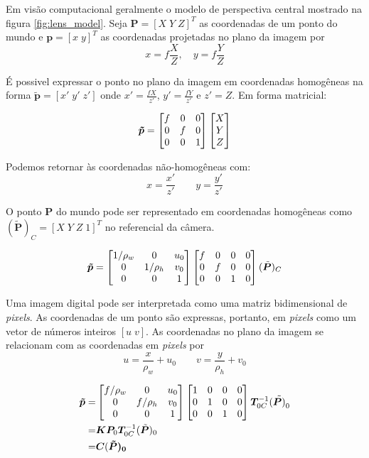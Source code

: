 Em visão computacional geralmente o modelo de perspectiva central mostrado na figura \ref{fig:lens_model}.
Seja $\bm{P} = [X\; Y\; Z]^T$ as coordenadas de um ponto do mundo e $\bm{p} = [x\;y]^T$ as coordenadas projetadas no plano da imagem por
\begin{equation}
x = f \frac{X}{Z}, \quad y = f \frac{Y}{Z}
\end{equation}

É possivel expressar o ponto no plano da imagem em coordenadas homogêneas na forma $\tilde{\bm{p}} = [x'\; y' \; z']$ onde $x' = \frac{fX}{z'}$, $y' = \frac{fY}{z'}$ e $z' = Z$. Em forma matricial:

\begin{equation}
\bm{\tilde{p}} = 
\begin{bmatrix} f & 0 & 0 \\
	 0 & f & 0 \\
	 0 & 0 & 1	
\end{bmatrix}
\begin{bmatrix}X\\Y\\Z\end{bmatrix}
\end{equation}

Podemos retornar às coordenadas não-homogêneas com:
\[ x = \frac{x'}{z'} \qquad y = \frac{y'}{z'}\]

O ponto $\bm{P}$ do mundo pode ser representado em coordenadas homogêneas como $(\bm{\tilde{P}})_C = [X \; Y \; Z \; 1]^T$ no referencial da câmera.

\begin{equation}
\bm{\tilde{p}} = 
\begin{bmatrix}
	1/\rho_w & 0 & u_0 \\
	0        & 1/\rho_h &v_0 \\
	0 & 0 & 1 \\
\end{bmatrix}
\begin{bmatrix} f & 0 & 0 & 0\\
	 0 & f & 0 & 0\\
	 0 & 0 & 1 & 0	
\end{bmatrix}
(\tilde{\bm{P}})_C
\end{equation}

Uma imagem digital pode ser interpretada como uma matriz bidimensional de \textit{pixels}. As coordenadas de um ponto são expressas, portanto, em \textit{pixels} como um vetor de números inteiros $[u\; v]$. As coordenadas no plano da imagem se relacionam com as coordenadas em \textit{pixels} por
\begin{equation}
u =  \frac{x}{\rho_w} + u_0 \qquad v = \frac{y}{\rho_h} + v_0
\end{equation}


\begin{align}\label{eq:camera_projection}
\bm{\tilde{p}} =& 
\begin{bmatrix}
	f/\rho_w & 0 & u_0 \\
	0        & f/\rho_h &v_0 \\
	0 & 0 & 1 \\
\end{bmatrix}
\begin{bmatrix}  1 & 0 & 0 & 0\\
	 0 & 1 & 0 & 0\\
	 0 & 0 & 1 & 0	
\end{bmatrix}
\bm{T}_{0C}^{-1} (\tilde{\bm{P})}_0\\
=& \bm{K} \bm{P}_0 \bm{T}_{0C}^{-1} (\tilde{\bm{P}})_0 \\ 
=& \bm{C} (\bm{\tilde{P})_0}
\end{align}

